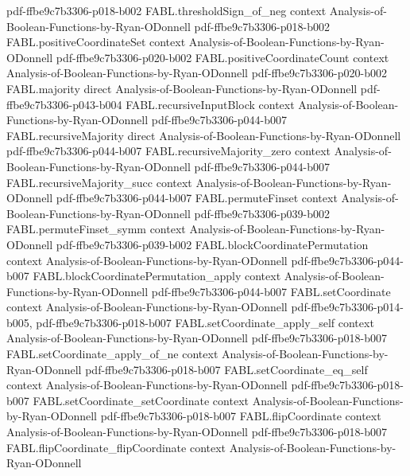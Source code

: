 \begin{theorem}
  {pdf-ffbe9c7b3306-p018-b002}
\proofstep
  {FABL.thresholdSign_of_neg}
  {context}
  {Analysis-of-Boolean-Functions-by-Ryan-ODonnell}
  {pdf-ffbe9c7b3306-p018-b002}
\proofstep
  {FABL.positiveCoordinateSet}
  {context}
  {Analysis-of-Boolean-Functions-by-Ryan-ODonnell}
  {pdf-ffbe9c7b3306-p020-b002}
\proofstep
  {FABL.positiveCoordinateCount}
  {context}
  {Analysis-of-Boolean-Functions-by-Ryan-ODonnell}
  {pdf-ffbe9c7b3306-p020-b002}
\proofstep
  {FABL.majority}
  {direct}
  {Analysis-of-Boolean-Functions-by-Ryan-ODonnell}
  {pdf-ffbe9c7b3306-p043-b004}
\proofstep
  {FABL.recursiveInputBlock}
  {context}
  {Analysis-of-Boolean-Functions-by-Ryan-ODonnell}
  {pdf-ffbe9c7b3306-p044-b007}
\proofstep
  {FABL.recursiveMajority}
  {direct}
  {Analysis-of-Boolean-Functions-by-Ryan-ODonnell}
  {pdf-ffbe9c7b3306-p044-b007}
\proofstep
  {FABL.recursiveMajority_zero}
  {context}
  {Analysis-of-Boolean-Functions-by-Ryan-ODonnell}
  {pdf-ffbe9c7b3306-p044-b007}
\proofstep
  {FABL.recursiveMajority_succ}
  {context}
  {Analysis-of-Boolean-Functions-by-Ryan-ODonnell}
  {pdf-ffbe9c7b3306-p044-b007}
\proofstep
  {FABL.permuteFinset}
  {context}
  {Analysis-of-Boolean-Functions-by-Ryan-ODonnell}
  {pdf-ffbe9c7b3306-p039-b002}
\proofstep
  {FABL.permuteFinset_symm}
  {context}
  {Analysis-of-Boolean-Functions-by-Ryan-ODonnell}
  {pdf-ffbe9c7b3306-p039-b002}
\proofstep
  {FABL.blockCoordinatePermutation}
  {context}
  {Analysis-of-Boolean-Functions-by-Ryan-ODonnell}
  {pdf-ffbe9c7b3306-p044-b007}
\proofstep
  {FABL.blockCoordinatePermutation_apply}
  {context}
  {Analysis-of-Boolean-Functions-by-Ryan-ODonnell}
  {pdf-ffbe9c7b3306-p044-b007}
\proofstep
  {FABL.setCoordinate}
  {context}
  {Analysis-of-Boolean-Functions-by-Ryan-ODonnell}
  {pdf-ffbe9c7b3306-p014-b005,
    pdf-ffbe9c7b3306-p018-b007}
\proofstep
  {FABL.setCoordinate_apply_self}
  {context}
  {Analysis-of-Boolean-Functions-by-Ryan-ODonnell}
  {pdf-ffbe9c7b3306-p018-b007}
\proofstep
  {FABL.setCoordinate_apply_of_ne}
  {context}
  {Analysis-of-Boolean-Functions-by-Ryan-ODonnell}
  {pdf-ffbe9c7b3306-p018-b007}
\proofstep
  {FABL.setCoordinate_eq_self}
  {context}
  {Analysis-of-Boolean-Functions-by-Ryan-ODonnell}
  {pdf-ffbe9c7b3306-p018-b007}
\proofstep
  {FABL.setCoordinate_setCoordinate}
  {context}
  {Analysis-of-Boolean-Functions-by-Ryan-ODonnell}
  {pdf-ffbe9c7b3306-p018-b007}
\proofstep
  {FABL.flipCoordinate}
  {context}
  {Analysis-of-Boolean-Functions-by-Ryan-ODonnell}
  {pdf-ffbe9c7b3306-p018-b007}
\proofstep
  {FABL.flipCoordinate_flipCoordinate}
  {context}
  {Analysis-of-Boolean-Functions-by-Ryan-ODonnell}

\end{theorem}
